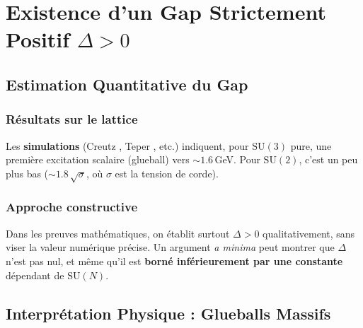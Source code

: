 \chapter{Existence d’un Gap Strictement Positif \texorpdfstring{\(\Delta>0\)}{Delta>0}}
\label{chap:10}

\section{Estimation Quantitative du Gap}
\label{sec:10.1}

\subsection*{Résultats sur le lattice}
Les \textbf{simulations} (Creutz \cite{Creutz1983}, Teper \cite{Teper1998}, etc.) indiquent, pour \(\mathrm{SU}(3)\) pure, une première excitation scalaire (glueball) vers \(\sim 1.6\)\,GeV. Pour \(\mathrm{SU}(2)\), c’est un peu plus bas (\(\sim 1.8\,\sqrt{\sigma}\), où \(\sigma\) est la tension de corde).

\subsection*{Approche constructive}
Dans les preuves mathématiques, on établit surtout \(\Delta>0\) qualitativement, sans viser la valeur numérique précise. Un argument \emph{a minima} peut montrer que \(\Delta\) n’est pas nul, et même qu’il est \textbf{borné inférieurement par une constante} dépendant de \(\mathrm{SU}(N)\).

\vspace{1em}

\section{Interprétation Physique : Glueballs Massifs}
\label{sec:10.2}

